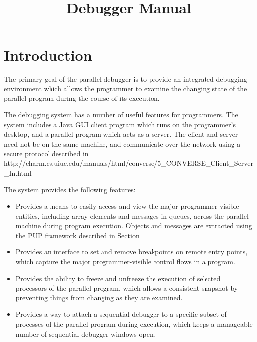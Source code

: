 \documentclass[10pt]{article}
\title{\charmpp\\ Debugger Manual}
\begin{document}
\maketitle

\section{Introduction}

The primary goal of the parallel debugger is to provide an integrated
debugging environment which allows the programmer to examine the
changing state of the parallel program during the course of its
execution.

The \charmpp{} debugging system has a number of useful features for
\charmpp{} programmers.  The system includes a Java GUI client program
which runs on the programmer's desktop, and a \charmpp{} parallel
program which acts as a server.  The client and server need not be on
the same machine, and communicate over the network using a secure
protocol described in
 http://charm.cs.uiuc.edu/manuals/html/converse/5\_CONVERSE\_Client\_Server\_In.html 

The system provides the following features: 

\begin{itemize}

\item Provides a means to easily access and view the major programmer
visible entities, including array elements and messages in queues,
across the parallel machine during program execution.  Objects and
messages are extracted using the \charmpp{} PUP framework described in
Section%

\item Provides an interface to set and remove breakpoints on remote
entry points, which capture the major
programmer-visible control flows in a \charmpp{} program. 

\item Provides the ability to freeze and unfreeze the execution of 
selected processors of the parallel program, which allows a 
consistent snapshot by 
preventing things from changing as they are examined.

\item Provides a way to attach a sequential debugger to a specific
subset of processes of the parallel program during execution,
which keeps a manageable number of sequential debugger windows open.

\end{itemize}
\end{document}
